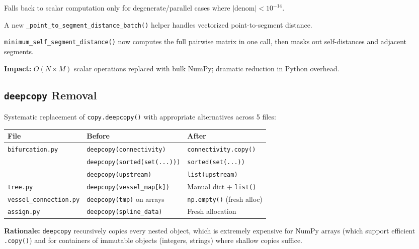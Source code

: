 \documentclass[11pt,a4paper]{article}
\begin{document}
Falls back to scalar computation only for degenerate/parallel cases where $|\text{denom}| < 10^{-14}$.

A new \texttt{\_point\_to\_segment\_distance\_batch()} helper handles vectorized point-to-segment distance.

\texttt{minimum\_self\_segment\_distance()} now computes the full pairwise matrix in one call, then masks out self-distances and adjacent segments.

\textbf{Impact:} $O(N \times M)$ scalar operations replaced with bulk NumPy; dramatic reduction in Python overhead.

\subsection{\texttt{deepcopy} Removal}

Systematic replacement of \texttt{copy.deepcopy()} with appropriate alternatives across 5 files:

\begin{longtable}{p{3.8cm}p{4cm}p{4.2cm}}
\toprule
\textbf{File} & \textbf{Before} & \textbf{After} \\
\midrule
\endhead
\texttt{bifurcation.py} & \texttt{deepcopy(connectivity)} & \texttt{connectivity.copy()} \\
 & \texttt{deepcopy(sorted(set(...)))} & \texttt{sorted(set(...))} \\
 & \texttt{deepcopy(upstream)} & \texttt{list(upstream)} \\
\midrule
\texttt{tree.py} & \texttt{deepcopy(vessel\_map[k])} & Manual dict + \texttt{list()} \\
\midrule
\texttt{vessel\_connection.py} & \texttt{deepcopy(tmp)} on arrays & \texttt{np.empty()} (fresh alloc) \\
\midrule
\texttt{assign.py} & \texttt{deepcopy(spline\_data)} & Fresh allocation \\
\bottomrule
\end{longtable}

\textbf{Rationale:} \texttt{deepcopy} recursively copies every nested object, which is extremely expensive for NumPy arrays (which support efficient \texttt{.copy()}) and for containers of immutable objects (integers, strings) where shallow copies suffice.

\end{document}
